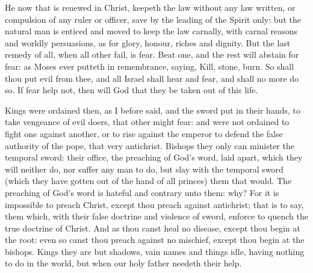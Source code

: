 He now that is renewed in Christ, keepeth the law 
without any law written, or compulsion of any ruler or 
officer, save by the leading of the Spirit only: but the 
natural man is enticed and moved to keep the law carnally,
with carnal reasons and worldly persuasions, as for glory,
honour, riches and dignity. But the last remedy of all, 
when all other fail, is fear. Beat one, and the rest will 
abstain for fear: as Moses ever putteth in remembrance, 
saying, Kill, stone, burn. So shall thou put evil from 
thee, and all Israel shall hear and fear, and shall no more 
do so. If fear help not, then will God that they be taken 
out of this life. 

Kings were ordained then, as I before said, and the 
sword put in their hands, to take vengeance of evil doers,
that other might fear: and were not ordained to fight one 
against another, or to rise against the emperor to defend 
the false authority of the pope, that very antichrist. Bishops
they only can minister the temporal sword: their 
office, the preaching of God's word, laid apart, which they 
will neither do, nor suffer any man to do, but slay with the 
temporal sword (which they have gotten out of the hand 
of all princes) them that would. The preaching of God's 
word is hateful and contrary unto them: why? For it is 
impossible to preach Christ, except thou preach against 
antichrist; that is to say, them which, with their false doctrine
and violence of sword, enforce to quench the true 
doctrine of Christ. And as thou canst heal no disease,
except thou begin at the root: even so canst thou preach 
against no mischief, except thou begin at the bishops. 
Kings they are but shadows, vain names and things idle, 
having nothing to do in the world, but when our holy
father needeth their help. 

